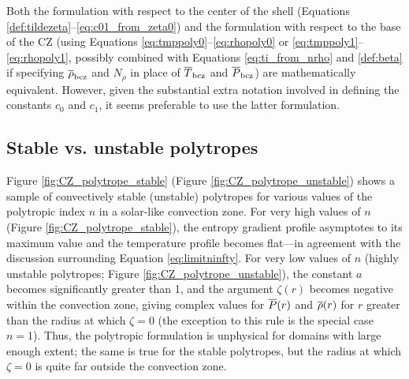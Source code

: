 \documentclass[12pt]{article} %
\begin{document}
Both the formulation with respect to the center of the shell (Equations \eqref{def:tildezeta}--\eqref{eq:c01_from_zeta0}) and the formulation with respect to the base of the CZ (using Equations \eqref{eq:tmppoly0}--\eqref{eq:rhopoly0} or   \eqref{eq:tmppoly1}--\eqref{eq:rhopoly1}, possibly combined with Equations \eqref{eq:ti_from_nrho} and \eqref{def:beta} if specifying $\overline{\rho}_{\rm{bcz}}$ and $N_\rho$ in place of $\overline{T}_{\rm{bcz}}$ and $\overline{P}_{\rm{bcz}}$) are mathematically equivalent. However, given the substantial extra notation involved in defining the constants $c_0$ and $c_1$, it seems preferable to use the latter formulation. 

\subsection{Stable vs. unstable polytropes}
Figure \ref{fig:CZ_polytrope_stable} (Figure \ref{fig:CZ_polytrope_unstable}) shows a sample of convectively stable (unstable) polytropes for various values of the polytropic index $n$ in a solar-like convection zone. For very high values of $n$ (Figure \ref{fig:CZ_polytrope_stable}), the entropy gradient profile asymptotes to its maximum value and the temperature profile becomes flat---in agreement with the discussion surrounding Equation \eqref{eq:limitninfty}. For very low values of $n$ (highly unstable polytropes; Figure \ref{fig:CZ_polytrope_unstable}), the constant $a$ becomes significantly greater than 1, and the argument $\zeta(r)$ becomes negative within the convection zone, giving complex values for $\overline{P}(r)$ and $\overline{\rho}(r)$ for $r$ greater than the radius at which $\zeta=0$ (the exception to this rule is the special case $n=1$). Thus, the polytropic formulation is unphysical for domains with large enough extent; the same is true for the stable polytropes, but the radius at which $\zeta=0$ is quite far outside the convection zone.
\end{document}

